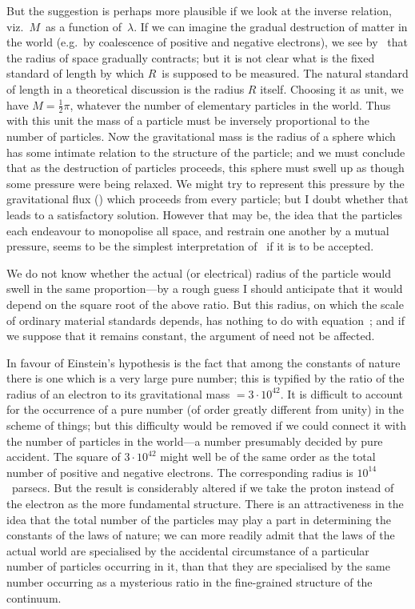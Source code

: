 \documentclass[12pt]{book}
\begin{document}
But the suggestion is perhaps more plausible if we look at the inverse
relation, viz.\ $M$~as a function of~$\lambda$. If we can imagine the gradual destruction
of matter in the world (e.g.\ by coalescence of positive and negative electrons),
we see by~ that the radius of space gradually contracts; but it is not
clear what is the fixed standard of length by which $R$~is supposed to be
measured. The natural standard of length in a theoretical discussion is the
radius $R$ itself. Choosing it as unit, we have $M = \frac{1}{2}\pi$, whatever the number
of elementary particles in the world. Thus with this unit the mass of a particle
must be inversely proportional to the number of particles. Now the gravitational
mass is the radius of a sphere which has some intimate relation to
the structure of the particle; and we must conclude that as the destruction
of particles proceeds, this sphere must swell up as though some pressure were
being relaxed. We might try to represent this pressure by the gravitational
flux () which proceeds from every particle; but I doubt whether that
leads to a satisfactory solution. However that may be, the idea that the
particles each endeavour to monopolise all space, and restrain one another by
a mutual pressure, seems to be the simplest interpretation of~ if it is to
be accepted.

We do not know whether the actual (or electrical) radius of the particle
would swell in the same proportion---by a rough guess I should anticipate
that it would depend on the square root of the above ratio. But this radius,
on which the scale of ordinary material standards depends, has nothing to do
with equation~; and if we suppose that it remains constant, the argument
of  need not be affected.

In favour of Einstein's hypothesis is the fact that among the constants of
%
nature there is one which is a very large pure number; this is typified by the
ratio of the radius of an electron to its gravitational mass $= 3 \cdot 10^{42}$. It is difficult
to account for the occurrence of a pure number (of order greatly different
from unity) in the scheme of things; but this difficulty would be removed if
we could connect it with the number of particles in the world---a number
presumably decided by pure accident\footnotemark.\footnotetext
  {The square of $3 \cdot 10^{42}$ might well be of the same order as the total number of positive and
  negative electrons. The corresponding radius is $10^{14}$~parsecs. But the result is considerably
  altered if we take the proton instead of the electron as the more fundamental structure.}
There is an attractiveness in the
idea that the total number of the particles may play a part in determining
the constants of the laws of nature; we can more readily admit that the laws
of the actual world are specialised by the accidental circumstance of a particular
number of particles occurring in it, than that they are specialised by
the same number occurring as a mysterious ratio in the fine-grained structure
of the continuum.
\end{document}
